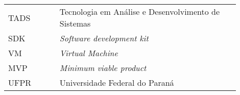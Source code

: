 

\begin{listaacron}

\begin{longtable}[l]{p{0.2\linewidth}p{0.7\linewidth}}
TADS & Tecnologia em Análise e Desenvolvimento de Sistemas\\
SDK & \emph{Software development kit}\\
VM & \emph{Virtual Machine}\\
MVP & \emph{Minimum viable product}\\
UFPR & Universidade Federal do Paraná\\
\end{longtable}

\end{listaacron}

